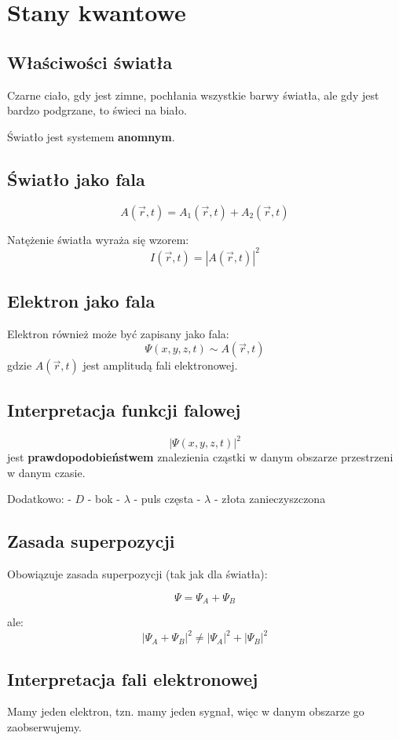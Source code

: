 \section{Stany kwantowe}

\subsection{Właściwości światła}
Czarne ciało, gdy jest zimne, pochłania wszystkie barwy światła, ale gdy jest bardzo podgrzane, to świeci na biało.

Światło jest systemem \textbf{anomnym}.

\subsection{Światło jako fala}
\[
A(\vec{r}, t) = A_1(\vec{r}, t) + A_2(\vec{r}, t)
\]

Natężenie światła wyraża się wzorem:
\[
I(\vec{r}, t) = |A(\vec{r}, t)|^2
\]

\subsection{Elektron jako fala}
Elektron również może być zapisany jako fala:
\[
\Psi(x,y,z,t) \sim A(\vec{r}, t)
\]
gdzie $A(\vec{r},t)$ jest amplitudą fali elektronowej.

\subsection{Interpretacja funkcji falowej}
\[
|\Psi(x,y,z,t)|^2
\]
jest \textbf{prawdopodobieństwem} znalezienia cząstki w danym obszarze przestrzeni w danym czasie.

Dodatkowo:
- $D$ - bok
- $\lambda$ - puls częsta
- $\lambda$ - złota zanieczyszczona

\subsection{Zasada superpozycji}
Obowiązuje zasada superpozycji (tak jak dla światła):

\[
\Psi = \Psi_A + \Psi_B
\]

ale:
\[
|\Psi_A + \Psi_B|^2 \neq |\Psi_A|^2 + |\Psi_B|^2
\]

\subsection{Interpretacja fali elektronowej}
Mamy jeden elektron, tzn. mamy jeden sygnał, więc w danym obszarze go zaobserwujemy.

